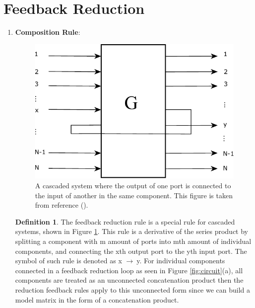 \documentclass[a4paper]{article}
\theoremstyle{definition}
\newtheorem{definition}{Definition}[section]
\begin{document}
\section*{Feedback Reduction}
\begin{enumerate}[label=(\roman*)]
\item
\textbf{Composition Rule}: 

\begin{figure}[H]
\centering
\includegraphics[width = 7.5 cm]{Feedback.pdf}
\caption{A cascaded system where the output of one port is connected to the input of another in the same component. This figure is taken from reference (\citealp{Combes_2017}).
}
\label{fig:feedback_reduction}
\end{figure}  
\begin{definition}
The feedback reduction rule is a special rule for cascaded systems, shown in Figure \ref{fig:feedback_reduction}. This rule is a derivative of the series product by splitting a component with m amount of ports into mth amount of individual components, and connecting the xth output port to the yth input port. The symbol of such rule is denoted as x $ \rightarrow \ $y. For individual components connected in a feedback reduction loop as seen in Figure \ref{fig:circuit}(a), all components are treated as an unconnected concatenation product then the reduction feedback rules apply to this unconnected form since we can build a model matrix in the form of a concatenation product. 



\end{definition}
\end{enumerate}
\end{document}
